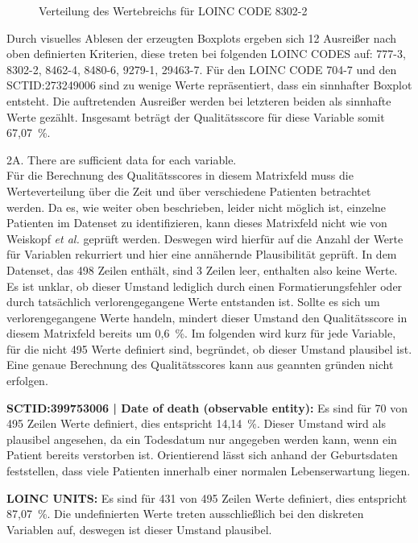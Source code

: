 \documentclass[12pt,a4paper,toc=bibliographynumbered,toc=indenttextentries]{scrreprt}
\begin{document}
\begin{description}
\begin{figure}
				\caption{Verteilung des Wertebreichs für LOINC CODE 8302-2}
			\end{figure}
		 	Durch visuelles Ablesen der erzeugten Boxplots ergeben sich 12 Ausreißer nach oben definierten Kriterien, diese treten bei folgenden LOINC CODES auf: 777-3, 8302-2, 8462-4, 8480-6, 9279-1, 29463-7. Für den LOINC CODE 704-7 und den SCTID:273249006 sind zu wenige Werte repräsentiert, dass ein sinnhafter Boxplot entsteht. Die auftretenden Ausreißer werden bei letzteren beiden als sinnhafte Werte gezählt.
		 	Insgesamt beträgt der Qualitätsscore für diese Variable somit 67,07~\%.\par
			
			\item 2A. There are sufficient data for each variable.\\
			Für die Berechnung des Qualitätsscores in diesem Matrixfeld muss die Werteverteilung über die Zeit und über verschiedene Patienten betrachtet werden. Da es, wie weiter oben beschrieben, leider nicht möglich ist, einzelne Patienten im Datenset zu identifizieren, kann dieses Matrixfeld nicht wie von Weiskopf \textit{et al.} geprüft werden. Deswegen wird hierfür auf die Anzahl der Werte für Variablen rekurriert und hier eine annähernde Plausibilität geprüft.
			In dem Datenset, das 498 Zeilen enthält, sind 3 Zeilen leer, enthalten also keine Werte. Es ist unklar, ob dieser Umstand lediglich durch einen Formatierungsfehler oder durch tatsächlich verlorengegangene Werte entstanden ist. Sollte es sich um verlorengegangene Werte handeln, mindert dieser Umstand den Qualitätsscore in diesem Matrixfeld bereits um 0,6~\%.
			Im folgenden wird kurz für jede Variable, für die nicht 495 Werte definiert sind, begründet, ob dieser Umstand plausibel ist. Eine genaue Berechnung des Qualitätsscores kann aus geannten gründen nicht erfolgen.\par
			\textbf{SCTID:399753006 | Date of death (observable entity):} Es sind für 70 von 495 Zeilen Werte definiert, dies entspricht 14,14~\%. Dieser Umstand wird als plausibel angesehen, da ein Todesdatum nur angegeben werden kann, wenn ein Patient bereits verstorben ist. Orientierend lässt sich anhand der Geburtsdaten feststellen, dass viele Patienten innerhalb einer normalen Lebenserwartung liegen.\par
			\textbf{LOINC UNITS:} Es sind für 431 von 495 Zeilen Werte definiert, dies entspricht 87,07~\%. Die undefinierten Werte treten ausschließlich bei den diskreten Variablen auf, deswegen ist dieser Umstand plausibel.\par

\end{description}
\end{document}
